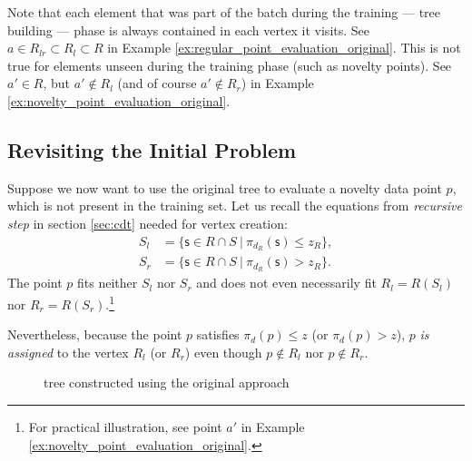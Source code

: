 Note that each element that was part of the batch during the training --- tree building --- phase is always contained in each vertex it visits. See $a \in R_{lr} \subset R_{l} \subset R$ in Example \ref{ex:regular_point_evaluation_original}.
This is not true for elements unseen during the training phase (such as novelty points).
See $a' \in R$, but $a' \notin R_l$ (and of course $a' \notin R_r$) in Example \ref{ex:novelty_point_evaluation_original}.

\subsection{Revisiting the Initial Problem}
\label{sec:revisiting}
Suppose we now want to use the original tree to evaluate a novelty data point $p$, which is not present in the training set.
Let us recall the equations from \textit{recursive step} in section \ref{sec:cdt} needed for vertex creation:
\begin{align*}
S_l &= \{ \mathsf{s} \in{R \cap S}\ |\ \pi_{d_R}(\mathsf{s})\le z_R\},\\
S_r &= \{ \mathsf{s} \in{R \cap S}\ |\ \pi_{d_R}(\mathsf{s}) > z_R\}.
\end{align*}
The point $p$ fits neither $S_l$ nor $S_r$ and does not even necessarily fit $R_l = R(S_l)$ nor $R_r = R(S_r)$.\footnote{For practical illustration, see point $a'$ in Example \ref{ex:novelty_point_evaluation_original}.}

Nevertheless, because the point $p$ satisfies  $\pi_d(p) \le z$ (or $\pi_d(p) > z$), $p$ \emph{is assigned} to the vertex $R_l$ (or $R_r$) even though $p \notin R_l$ nor $p \notin R_r$.



\begin{figure*}[!t]

\caption{tree constructed using the original approach}
\label{fig:example_noutlier_tree_color}
\end{figure*}


% 

